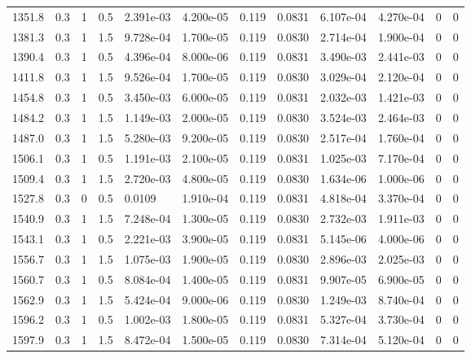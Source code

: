 \documentclass[preview]{standalone}
\begin{document}
{{{\begin{tabular}{L{1.2cm}C{1.2cm} C{0.3cm}C{0.5cm} C{1.4cm}C{1.4cm} C{1.4cm}C{1.4cm} C{1.6cm}C{1.6cm} C{1.6cm}C{1.6cm}}
  1351.8  &   0.3  & 1     & 0.5 &  2.391e-03  & 4.200e-05  &  0.119&   0.0831& 6.107e-04 & 4.270e-04   &  0 & 0  \\ 
  1381.3  &   0.3  & 1     & 1.5 &  9.728e-04  & 1.700e-05  &  0.119&   0.0830& 2.714e-04 & 1.900e-04   &  0 & 0  \\ 
  1390.4  &   0.3  & 1     & 0.5 &  4.396e-04  & 8.000e-06  &  0.119&   0.0831& 3.490e-03 & 2.441e-03   &  0 & 0  \\ 
  1411.8  &   0.3  & 1     & 1.5 &  9.526e-04  & 1.700e-05  &  0.119&   0.0830& 3.029e-04 & 2.120e-04   &  0 & 0  \\ 
  1454.8  &   0.3  & 1     & 0.5 &  3.450e-03  & 6.000e-05  &  0.119&   0.0831& 2.032e-03 & 1.421e-03   &  0 & 0  \\ 
  1484.2  &   0.3  & 1     & 1.5 &  1.149e-03  & 2.000e-05  &  0.119&   0.0830& 3.524e-03 & 2.464e-03   &  0 & 0  \\ 
  1487.0  &   0.3  & 1     & 1.5 &  5.280e-03  & 9.200e-05  &  0.119&   0.0830& 2.517e-04 & 1.760e-04   &  0 & 0  \\ 
  1506.1  &   0.3  & 1     & 0.5 &  1.191e-03  & 2.100e-05  &  0.119&   0.0831& 1.025e-03 & 7.170e-04   &  0 & 0  \\ 
  1509.4  &   0.3  & 1     & 1.5 &  2.720e-03  & 4.800e-05  &  0.119&   0.0830& 1.634e-06 & 1.000e-06   &  0 & 0  \\ 
  1527.8  &   0.3  & 0     & 0.5 &  0.0109  & 1.910e-04  &  0.119&   0.0831& 4.818e-04 & 3.370e-04   &  0 & 0  \\ 
  1540.9  &   0.3  & 1     & 1.5 &  7.248e-04  & 1.300e-05  &  0.119&   0.0830& 2.732e-03 & 1.911e-03   &  0 & 0  \\ 
  1543.1  &   0.3  & 1     & 0.5 &  2.221e-03  & 3.900e-05  &  0.119&   0.0831& 5.145e-06 & 4.000e-06   &  0 & 0  \\ 
  1556.7  &   0.3  & 1     & 1.5 &  1.075e-03  & 1.900e-05  &  0.119&   0.0830& 2.896e-03 & 2.025e-03   &  0 & 0  \\ 
  1560.7  &   0.3  & 1     & 0.5 &  8.084e-04  & 1.400e-05  &  0.119&   0.0831& 9.907e-05 & 6.900e-05   &  0 & 0  \\ 
  1562.9  &   0.3  & 1     & 1.5 &  5.424e-04  & 9.000e-06  &  0.119&   0.0830& 1.249e-03 & 8.740e-04   &  0 & 0  \\ 
  1596.2  &   0.3  & 1     & 0.5 &  1.002e-03  & 1.800e-05  &  0.119&   0.0831& 5.327e-04 & 3.730e-04   &  0 & 0  \\ 
  1597.9  &   0.3  & 1     & 1.5 &  8.472e-04  & 1.500e-05  &  0.119&   0.0830& 7.314e-04 & 5.120e-04   &  0 & 0  \\ 

\end{tabular}}}}
\end{document}
